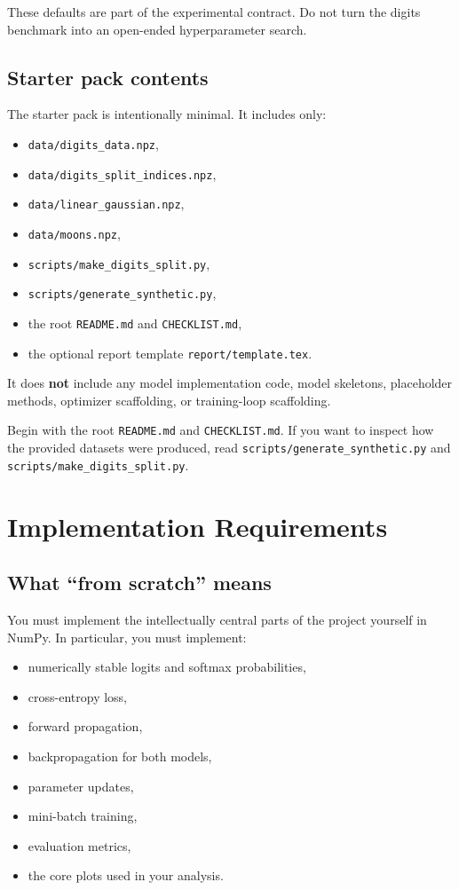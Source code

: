 \documentclass[11pt]{article}
\newcommand{\filepath}[1]{\nolinkurl{#1}}
\begin{document}
These defaults are part of the experimental contract. Do not turn the digits benchmark into an open-ended hyperparameter search.

\subsection{Starter pack contents}

The starter pack is intentionally minimal. It includes only:

\begin{itemize}
    \item \filepath{data/digits_data.npz},
    \item \filepath{data/digits_split_indices.npz},
    \item \filepath{data/linear_gaussian.npz},
    \item \filepath{data/moons.npz},
    \item \filepath{scripts/make_digits_split.py},
    \item \filepath{scripts/generate_synthetic.py},
    \item the root \filepath{README.md} and \filepath{CHECKLIST.md},
    \item the optional report template \filepath{report/template.tex}.
\end{itemize}

It does \textbf{not} include any model implementation code, model skeletons, placeholder methods, optimizer scaffolding, or training-loop scaffolding.

Begin with the root \filepath{README.md} and \filepath{CHECKLIST.md}. If you want to inspect how the provided datasets were produced, read \filepath{scripts/generate_synthetic.py} and \filepath{scripts/make_digits_split.py}.

\section{Implementation Requirements}

\subsection{What ``from scratch'' means}

You must implement the intellectually central parts of the project yourself in NumPy. In particular, you must implement:

\begin{itemize}
    \item numerically stable logits and softmax probabilities,
    \item cross-entropy loss,
    \item forward propagation,
    \item backpropagation for both models,
    \item parameter updates,
    \item mini-batch training,
    \item evaluation metrics,
    \item the core plots used in your analysis.
\end{itemize}
\end{document}
